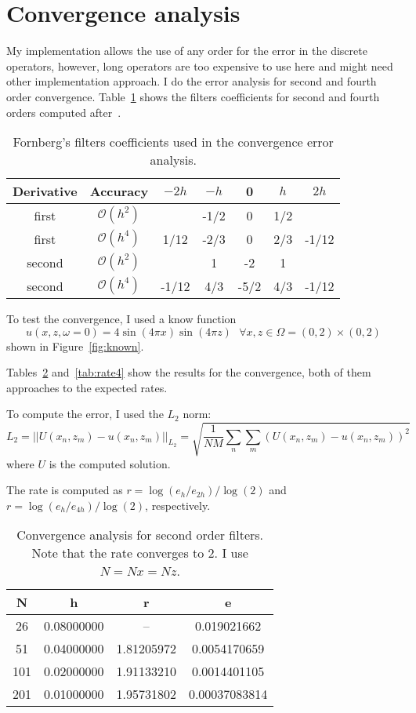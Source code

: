 \documentclass[10pt]{article}
\begin{document}
\section{Convergence analysis}
My implementation allows the use of any order for the error in the discrete operators, however, long operators are too expensive to use here and might
need other implementation approach. I do the error analysis for second and fourth order convergence. Table~\ref{tab:coeff} shows 
the filters coefficients for second and fourth orders computed after~\cite{Fornberg88}.

\begin{table}
\centering
  \begin{tabular}{c  c  c c c c c}
Derivative & Accuracy           & $-2h$ & $-h$     & 0   & $h$   & $2h$     \\  \hline
first      & $\mathcal{O}(h^2)$ &       & -1/2     & 0   & 1/2   &          \\  
first      & $\mathcal{O}(h^4)$ &1/12   & -2/3     & 0   & 2/3   & -1/12    \\  
second     & $\mathcal{O}(h^2)$ &       &  1       & -2  & 1     &          \\  
second     & $\mathcal{O}(h^4)$ &-1/12  & 4/3      &-5/2 & 4/3   & -1/12      
  \end{tabular}
\caption{Fornberg's filters coefficients used in the convergence error analysis.}
\label{tab:coeff}
\end{table}

To test the convergence, I used a know function
\[
 u(x,z,\omega=0) = 4\sin(4\pi x)\sin(4\pi z) \mbox{ }\forall x,z\in \Omega =(0,2)\times(0,2)
\]
shown in Figure~\ref{fig:known}.

Tables~\ref{tab:rate2} and~\ref{tab:rate4} show the results for the convergence, both of them
approaches to the expected rates.

To compute the error, I used the $L_2$ norm:
\[
L_2 = ||U(x_n,z_m)-u(x_n,z_m)||_{L_2} = \sqrt{\frac{1}{NM}\sum_n\sum_m (U(x_n,z_m)-u(x_n,z_m))^2}
\]
where $U$ is the computed solution.

The rate is computed as $r = \log(e_h/e_{2h})/\log(2)$ and $r = \log(e_h/e_{4h})/\log(2)$, respectively.

\begin{table}
\centering
  \begin{tabular}{c c c c}
  N&     h     &     r     &     e        \\ \hline
 26& 0.08000000&  --       & 0.019021662  \\
 51& 0.04000000& 1.81205972& 0.0054170659 \\
101& 0.02000000& 1.91133210& 0.0014401105 \\ 
201& 0.01000000& 1.95731802& 0.00037083814
  \end{tabular}
\caption{Convergence analysis for second order filters. Note that the rate converges to 2. I use $N=Nx=Nz$.}
\label{tab:rate2}
\end{table}
\end{document}
